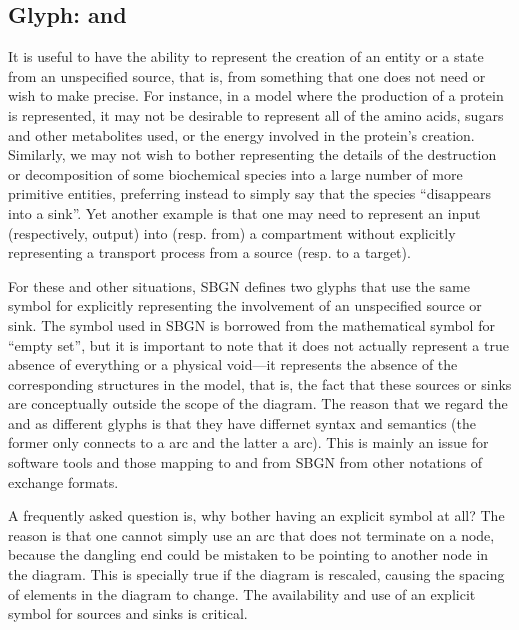 
\subsection{Glyph:  and }
\label{sec:sourceSink}

It is useful to have the ability to represent the creation of an entity or
a state from an unspecified source, that is, from something that one does
not need or wish to make precise.  For instance, in a model where the
production of a protein is represented, it may not be desirable to
represent all of the amino acids, sugars and other metabolites used, or the
energy involved in the protein's creation.  Similarly, we may not wish to
bother representing the details of the destruction or decomposition of some
biochemical species into a large number of more primitive entities,
preferring instead to simply say that the species ``disappears into a
sink''.  Yet another example is that one may need to represent an input
(respectively, output) into (resp. from) a compartment without explicitly
representing a transport process from a source (resp. to a target).

For these and other situations, SBGN defines two glyphs that use the same symbol for explicitly
representing the involvement of an unspecified source or sink.  The symbol
used in SBGN is borrowed from the mathematical symbol for ``empty set'',
but it is important to note that it does not actually represent a true
absence of everything or a physical void---it represents the absence of the
corresponding structures in the model, that is, the fact that these sources
or sinks are conceptually outside the scope of the diagram. The reason that we
regard the  and  as different glyphs is that they have differnet
syntax and semantics (the former only connects to a  arc and the latter
a  arc). This is mainly an issue for software tools and those mapping to
and from SBGN from other notations of exchange formats.

A frequently asked question is, why bother having an explicit symbol at
all?  The reason is that one cannot simply use an arc that does not
terminate on a node, because the dangling end could be mistaken to be
pointing to another node in the diagram.  This is specially true if the
diagram is rescaled, causing the spacing of elements in the diagram to
change.  The availability and use of an explicit symbol for sources and
sinks is critical.

